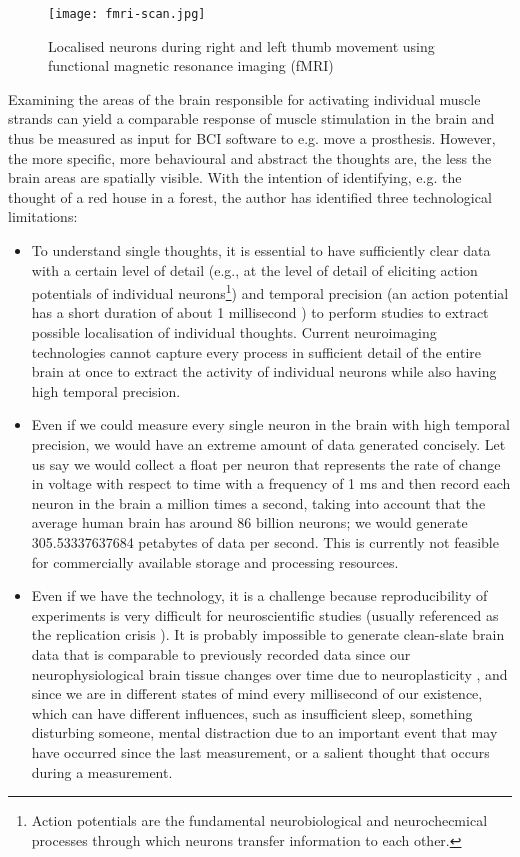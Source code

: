 \begin{figure}[ht]
  \centering
  \texttt{[image: fmri-scan.jpg]}
  \caption{Localised neurons during right and left thumb movement using functional magnetic resonance imaging (fMRI) \citep{rashid_bilateral_2018}}
  \label{fig:fmri-scan}
\end{figure}

Examining the areas of the brain responsible for activating individual muscle strands can yield a comparable response of muscle stimulation in the brain and thus be measured as input for BCI software to e.g. move a prosthesis. However, the more specific, more behavioural and abstract the thoughts are, the less the brain areas are spatially visible. With the intention of identifying, e.g. the thought of a red house in a forest, the author has identified three technological limitations:

\begin{itemize}
  \item To understand single thoughts, it is essential to have sufficiently clear data with a certain level of detail (e.g., at the level of detail of eliciting action potentials of individual neurons\footnote{Action potentials are the fundamental neurobiological and neurochecmical processes through which neurons transfer information to each other.}) and temporal precision (an action potential has a short duration of about 1 millisecond \citep{byrne_resting_2021}) to perform studies to extract possible localisation of individual thoughts. Current neuroimaging technologies cannot capture every process in sufficient detail of the entire brain at once to extract the activity of individual neurons while also having high temporal precision.
  \item Even if we could measure every single neuron in the brain with high temporal precision, we would have an extreme amount of data generated concisely. Let us say we would collect a float per neuron that represents the rate of change in voltage with respect to time with a frequency of 1 ms and then record each neuron in the brain a million times a second, taking into account that the average human brain has around 86 billion neurons; we would generate 305.53337637684 petabytes of data per second. This is currently not feasible for commercially available storage and processing resources.
  \item Even if we have the technology, it is a challenge because reproducibility of experiments is very difficult for neuroscientific studies (usually referenced as the replication crisis \citep{maxwell_is_2015}). It is probably impossible to generate clean-slate brain data that is comparable to previously recorded data since our neurophysiological brain tissue changes over time due to neuroplasticity \citep{puderbaugh_neuroplasticity_2022}, and since we are in different states of mind every millisecond of our existence, which can have different influences, such as insufficient sleep, something disturbing someone, mental distraction due to an important event that may have occurred since the last measurement, or a salient thought that occurs during a measurement.
\end{itemize}

